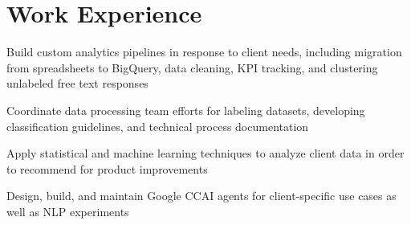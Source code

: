 \documentclass[letterpaper]{deedy-resume_sm} %
\begin{document}

\lastupdated %


\section{Work Experience}

\begin{tightitemize}
\item Build custom analytics pipelines in response to client needs, including migration from spreadsheets to BigQuery, data cleaning, KPI tracking, and clustering unlabeled free text responses
\item Coordinate data processing team efforts for labeling datasets, developing classification guidelines, and technical process documentation
\end{tightitemize}

\begin{tightitemize}
\item Apply statistical and machine learning techniques to analyze client data in order to recommend for product improvements
\item Design, build, and maintain Google CCAI agents for client-specific use cases as well as NLP experiments
\end{tightitemize}
\end{document}

